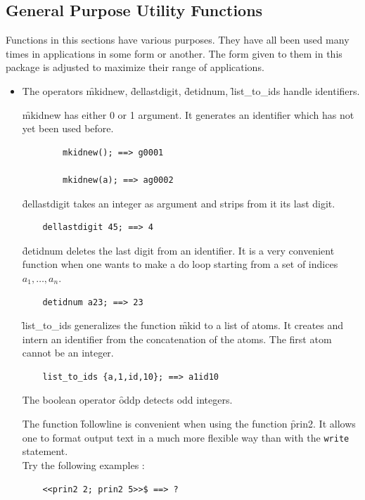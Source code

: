 \subsection{General Purpose Utility Functions}
Functions in this sections have various purposes. They have all been used
many times in applications in some form or another. The form given
to them in this package is adjusted to maximize their range of applications.
\begin{itemize}
\item[i.]
\hypertarget{operator:MKIDNEW}{}
\hypertarget{operator:DELLASTDIGIT}{}
\hypertarget{operator:DETIDNUM}{}
\hypertarget{operator:LIST_TO_IDS}{}
The operators \f{mkidnew}, \f{dellastdigit}, \f{detidnum}, \f{list\_to\_ids}
handle identifiers.

\f{mkidnew} has either 0 or 1 argument.
It generates an identifier which has not yet been used before.
\begin{verbatim}
        mkidnew(); ==> g0001

        mkidnew(a); ==> ag0002
\end{verbatim}
\f{dellastdigit} takes an integer as argument and strips from it its last
digit.
\begin{verbatim}
    dellastdigit 45; ==> 4
\end{verbatim}
\f{detidnum} deletes the last digit from an
identifier. It is a very convenient function when one wants to make a do
loop starting from a set of indices $ a_1, \ldots , a_{n} $.
\begin{verbatim}
    detidnum a23; ==> 23
\end{verbatim}

\f{list\_to\_ids} generalizes the function \f{mkid} to a list of
atoms. It creates and intern an identifier from the concatenation of
the atoms. The first atom cannot be an integer.
\begin{verbatim}
    list_to_ids {a,1,id,10}; ==> a1id10
\end{verbatim}
\hypertarget{operator:ODDP}{}
The boolean operator \f{oddp}  detects odd integers.

\hypertarget{operator:FOLLOWLINE}{}
The function \f{followline} is convenient when using the function \f{prin2}.
It allows one to format output text in a much more flexible way than with
the \texttt{write} statement. \\
Try the following examples :
\begin{verbatim}
    <<prin2 2; prin2 5>>$ ==> ?


\end{verbatim}
\end{itemize}

